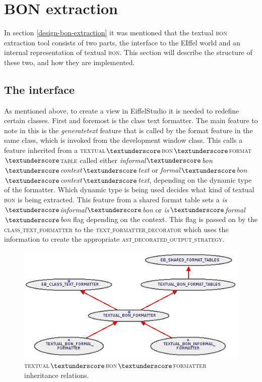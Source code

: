 \section{BON extraction}
In section \ref{design-bon-extraction} it was mentioned that the textual \textsc{bon} extraction tool consists of two parts, the interface to the EIffel world and an internal representation of textual \textsc{bon}. This section will describe the structure of these two, and how they are implemented.
\subsection{The interface}
\label{why_interface_takes_care_of_formal_and_informal}
As mentioned above, to create a view in EiffelStudio it is needed to redefine certain classes. First and foremost is the class text formatter. The main feature to note in this is the \textit{generate\textunderscore text} feature that is called by the format feature in the same class, which is invoked from the development window class. This calls a feature inherited from a \textsc{textual$\textunderscore$bon$\textunderscore$format$\textunderscore$table} called either \textit{informal$\textunderscore$bon$\textunderscore$context$\textunderscore$text} or \textit{formal$\textunderscore$bon$\textunderscore$context$\textunderscore$text}, depending on the dynamic type of the formatter. Which dynamic type is being used decides what kind of textual \textsc{bon} is being extracted. This feature from a shared format table sets a \textit{is$\textunderscore$informal$\textunderscore$bon} or \textit{is$\textunderscore$formal$\textunderscore$bon} flag depending on the context. This flag is passed on by the \textsc{class$\_$text$\_$formatter} to the \textsc{text$\_$formatter$\_$decorator} which uses the information to create the appropriate \textsc{ast$\_$decorated$\_$output$\_$strategy}.
\begin{figure}
\centerline{
\includegraphics[scale=0.7]{images/textual-bon-formatter.png}
}
\caption{\textsc{textual$\textunderscore$bon$\textunderscore$formatter} inheritance relations.}
\label{fig:textual_bon_formatter}
\end{figure}

